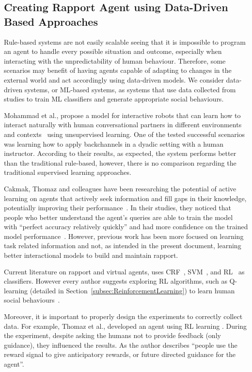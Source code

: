 \subsection{Creating Rapport Agent using Data-Driven Based Approaches}
\label{sub:sec:datadrivenbasedAgents}

Rule-based systems are not easily scalable seeing that it is impossible to program an agent to handle every possible situation and outcome, especially when interacting with the unpredictability of human behaviour. Therefore, some scenarios may benefit of having agents capable of adapting to changes in the external world and act accordingly using data-driven models. We consider data-driven systems, or \ac{ML}-based systems, as systems that use data collected from studies to train \ac{ML} classifiers and generate appropriate social behaviours.

Mohammad et al., propose a model for interactive robots that can learn how to interact naturally with human conversational partners in different environments and contexts~\cite{Mohammad2010} using unsupervised learning. One of the tested successful scenarios was learning how to apply backchannels in a dyadic setting with a human instructor. According to their results, as expected, the system performs better than the traditional rule-based, however, there is no comparison regarding the traditional supervised learning approaches.

Cakmak, Thomaz and colleagues have been researching the potential of active learning on agents that actively seek information and fill gaps in their knowledge, potentially improving their performance~\cite{Chao2010, Cakmak2010, Cakmak2012, Thomaz2006}. In their studies, they noticed that people who better understand the agent's queries are able to train the model with ``perfect accuracy relatively quickly'' and had more confidence on the trained model performance~\cite{Chao2010}. However, previous work has been more focused on learning task related information and not, as intended in the present document, learning better interactional models to build and maintain rapport.

Current literature on rapport and virtual agents, uses \ac{CRF}~\cite{Buschmeier2011}, \ac{SVM}~\cite{Kok2012}, and \ac{RL}~\cite{Thomaz2006} as classifiers. However every author suggests exploring \ac{RL} algorithms, such as Q-learning (detailed in Section~\ref{subsec:ReinforcementLearning}) to learn human social behaviours~\cite{Thomaz2006, Kok2012, Zhao2014, Papangelis2014, Blumberg2002, Andrist2015}. 

Moreover, it is important to properly design the experiments to correctly collect data. For example, Thomaz et al., developed an agent using \ac{RL} learning \cite{Thomaz2006}. During the experiment, despite asking the humans not to provide feedback (only guidance), they influenced the results. As the author describes ``people use the reward signal to give anticipatory rewards, or future directed guidance for the agent''.



